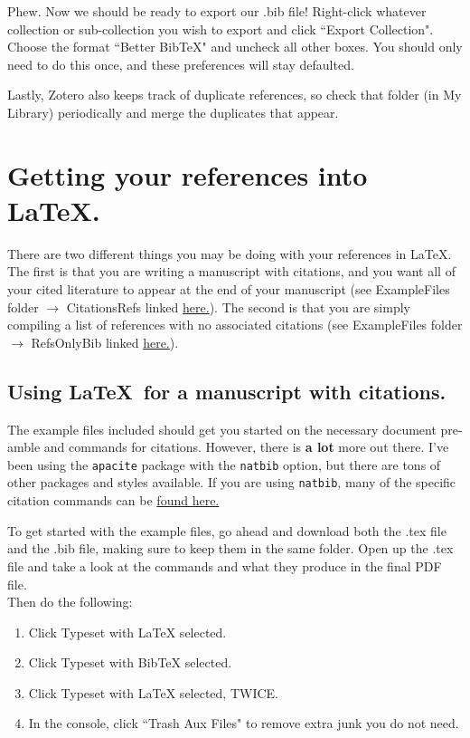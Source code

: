 \documentclass[11pt]{article}
\begin{document}
Phew. Now we should be ready to export our .bib file! Right-click whatever collection or sub-collection you wish to export and click ``Export Collection". Choose the format ``Better BibTeX" and uncheck all other boxes. You should only need to do this once, and these preferences will stay defaulted. 

Lastly, Zotero also keeps track of duplicate references, so check that folder (in My Library) periodically and merge the duplicates that appear.

\section{Getting your references into \LaTeX.}

There are two different things you may be doing with your references in \LaTeX. The first is that you are writing a manuscript with citations, and you want all of your cited literature to appear at the end of your manuscript (see ExampleFiles folder $\rightarrow$ CitationsRefs linked \href{https://github.com/ledelaney/BibTeXforBrownLab/tree/master/ExampleFiles/CitationsRefs}{here.}). The second is that you are simply compiling a list of references with no associated citations (see ExampleFiles folder $\rightarrow$ RefsOnlyBib linked \href{https://github.com/ledelaney/BibTeXforBrownLab/tree/master/ExampleFiles/RefsOnlyBib}{here.}).

\subsection{Using \LaTeX\ for a manuscript with citations.}
The example files included should get you started on the necessary document pre-amble and commands for citations. However, there is \textbf{a lot} more out there. I've been using the \verb|apacite| package with the \verb|natbib| option, but there are tons of other packages and styles available. If you are using \verb|natbib|, many of the specific citation commands can be \href{https://gking.harvard.edu/files/natbib2.pdf}{found here.}

To get started with the example files, go ahead and download both the .tex file and the .bib file, making sure to keep them in the same folder. Open up the .tex file and take a look at the commands and what they produce in the final PDF file.\\

Then do the following:

\begin{enumerate}
\item{Click Typeset with LaTeX selected.}
\item{Click Typeset with BibTeX selected.}
\item{Click Typeset with LaTeX selected, TWICE.}
\item{In the console, click ``Trash Aux Files" to remove extra junk you do not need.}
\end{enumerate}
\end{document}
